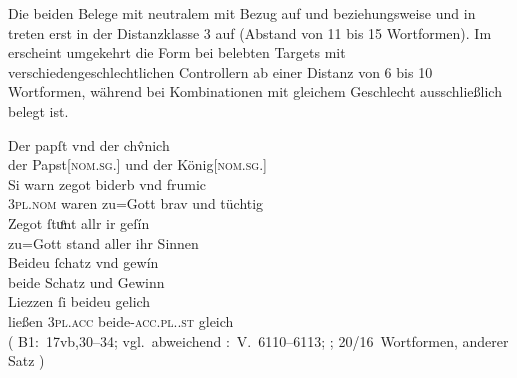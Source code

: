 Die beiden Belege mit neutralem  mit Bezug auf 
 und   beziehungsweise 
 und   in  treten erst in
der Distanzklasse 3 auf (Abstand von 11 bis 15 Wortformen). Im \CAO{} erscheint
umgekehrt die Form  bei belebten Targets mit
verschieden\-geschlechtlichen Controllern ab einer Distanz von 6 bis 10
Wortformen, während bei Kombinationen mit gleichem Geschlecht ausschließlich
 belegt ist.

\begin{exe}
\ex \label{ex:combgenddist2}
	\begin{xlist}
	\ex\label{ex:papstkoenig6} %
		\gll Der papſt vnd der chv̂nich \\
			der Papst[\textsc{nom.sg.\MascM}] und der
			König[\textsc{nom.sg.\MascM}] \\
	\sn \gll Si warn zegot biderb vnd frumic \\
			\textsc{3pl\subM.nom} waren {zu=Gott} brav und tüchtig \\
	\sn \gll Zegot ſtuͦnt allr ir geſín \\
			{zu=Gott} stand aller ihr Sinnen \\
	\sn \gll Beideu ſchatz vnd gewín \\
			beide Schatz und Gewinn \\
	\sn \gll Liezzen ſi beideu gelich \\
			ließen \textsc{3pl\subM.acc} beide-\textsc{acc.pl.\NeutM.st}
			gleich \\
		\trans {}
			(%
				B1:~17vb,30--34; vgl.~abweichend
				\KC:~V.~6110--6113;
				\cite[194]{schroeder1895};
				20/16~Wortformen, anderer Satz%
			)

	\end{xlist}
\end{exe}

